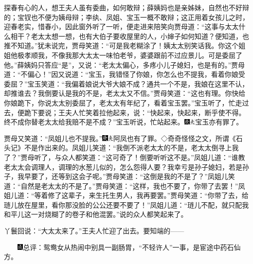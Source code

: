 探春有心的人，想王夫人虽有委曲，如何敢辩；薛姨妈也是亲姊妹，自然也不好辩的；宝钗也不便为姨母辩；李纨、凤姐、宝玉一概不敢辩；这正用着女孩儿之时，迎春老实，惜春小，因此窗外听了一听，便走进来陪笑向贾母道：``这事与太太什么相干？老太太想一想，也有大伯子要收屋里的人，小婶子如何知道？便知道，也推不知道。''犹未说完，贾母笑道：``可是我老糊涂了！姨太太别笑话我。你这个姐姐他极孝顺我，不像我那大太太一味怕老爷，婆婆跟前不过应景儿。可是委屈了他。''薛姨妈只答应``是''，又说：``老太太偏心，多疼小儿子媳妇，也是有的。''贾母道：``不偏心！''因又说道：``宝玉，我错怪了你娘，你怎么也不提我，看着你娘受委屈？''宝玉笑道：``我偏着娘说大爷大娘不成？通共一个不是，我娘在这里不认，却推谁去？我倒要认是我的不是，老太太又不信。''贾母笑道：``这也有理。你快给你娘跪下，你说太太别委屈了，老太太有年纪了，看着宝玉罢。''宝玉听了，忙走过去，便跪下要说；王夫人忙笑着拉他起来，说：``快起来，快起来，断乎使不得。终不成你替老太太给我赔不是不成？''宝玉听说，忙站起来。{\includegraphics[width=3mm]{../Images/00004}\includegraphics[width=3mm]{../Images/00012}\footnotesize \kaishu 宝玉亦有罪了。}

贾母又笑道：``凤姐儿也不提我。''{\includegraphics[width=3mm]{../Images/00004}\includegraphics[width=3mm]{../Images/00012}\footnotesize \kaishu 阿凤也有了罪。◇奇奇怪怪之文，所谓《石头记》不是作出来的。}凤姐儿笑道：``我倒不派老太太的不是，老太太倒寻上我了？''贾母听了，与众人都笑道：``这可奇了！倒要听听这不是。''凤姐儿道：``谁教老太太会调理人，调理的水葱儿似的，怎么怨得人要？我幸亏是孙子媳妇，若是孙子，我早要了，还等到这会子呢。''贾母笑道：``这倒是我的不是了？''凤姐儿笑道：``自然是老太太的不是了。''贾母笑道：``这样，我也不要了，你带了去罢！''凤姐儿道：``等着修了这辈子，来生托生男人，我再要罢。''贾母笑道：``你带了去，给琏儿放在屋里，看你那没脸的公公还要不要了！''凤姐儿道：``琏儿不配，就只配我和平儿这一对烧糊了的卷子和他混罢。''说的众人都笑起来了。

丫鬟回说：``大太太来了。''王夫人忙迎了出去。要知端的------

{　　\includegraphics[width=3mm]{../Images/00005}总评：鸳鸯女从热闹中别具一副肠胃，``不轻许人''一事，是宦途中药石仙方。}

